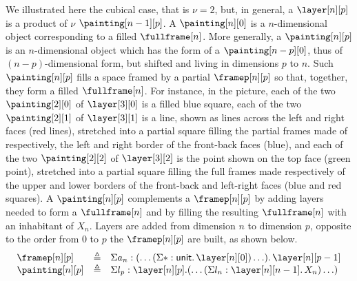\documentclass{msc}
\newcommand{\unittype}{\ensuremath{\mathsf{unit}}}
\newcommand{\unitpoint}{\ensuremath{\ast}}
\newcommand{\defeq}{\ensuremath{\triangleq}}
\begin{document}
We illustrated here the cubical case, that is $\nu = 2$, but, in general, a $\layer[n][p]$ is a product of $\nu$ $\painting[n - 1][p]$. A $\painting[n][0]$ is a $n$-dimensional object corresponding to a filled $\fullframe[n]$. More generally, a $\painting[n][p]$ is an $n$-dimensional object which has the form of a $\painting[n-p][0]$, thus of $(n-p)$-dimensional form, but shifted and living in dimensions $p$ to $n$. Such $\painting[n][p]$ fills a space framed by a partial $\framep[n][p]$ so that, together, they form a filled $\fullframe[n]$. For instance, in the picture, each of the two $\painting[2][0]$ of $\layer[3][0]$ is a filled blue square, each of the two $\painting[2][1]$ of $\layer[3][1]$ is a line, shown as lines across the left and right faces (red lines), stretched into a partial square filling the partial frames made of respectively, the left and right border of the front-back faces (blue), and each of the two $\painting[2][2]$ of $\layer[3][2]$ is the point shown on the top face (green point), stretched into a partial square filling the full frames made respectively of the upper and lower borders of the front-back and left-right faces (blue and red squares). A $\painting[n][p]$ complements a $\framep[n][p]$ by adding layers needed to form a $\fullframe[n]$ and by filling the resulting $\fullframe[n]$ with an inhabitant of $X_n$. Layers are added from dimension $n$ to dimension $p$, opposite to the order from $0$ to $p$ the $\framep[n][p]$ are built, as shown below.
\begin{equation*}
  \begin{array}{lll}
    \framep[n][p]   & \defeq & \Sigma a_n: (\ldots (\Sigma \unitpoint: \unittype .\, \layer[n][0]) \ldots) .\, \layer[n][p - 1] \\
    \painting[n][p] & \defeq & \Sigma l_p: \layer[n][p]. (\ldots (\Sigma l_n: \layer[n][n - 1] .\, X_n) \ldots)
  \end{array}
\end{equation*}
\end{document}
